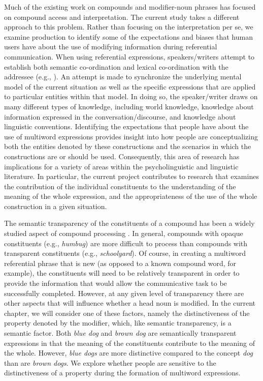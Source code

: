\documentclass[output=paper]{langsci/langscibook}
\begin{document}
Much of the existing work on compounds and modifier-noun phrases has
focused on compound access and interpretation. The current study takes
a different approach to this problem. Rather than focusing on the
interpretation per se, we examine production to identify some of the
expectations and biases that human users have about the use of
modifying information during referential communication. When using
referential expressions, speakers/writers attempt to establish both
semantic co-ordination and lexical co-ordination with the addressee
(e.g.,
\citealt{clark1986referring,garrod1987saying,clark1989contributing}). An
attempt is made to synchronize the underlying mental model of the
current situation as well as the specific expressions that are applied
to particular entities within that model. In doing so, the
speaker/writer draws on many different types of knowledge, including
world knowledge, knowledge about information expressed in the
conversation/discourse, and knowledge about linguistic
conventions. Identifying the expectations that people have about the
use of multiword expressions provides insight into how people are
conceptualizing both the entities denoted by these constructions and
the scenarios in which the constructions are or should be used.
Consequently, this area of research has implications for a variety of
areas within the psycholinguistic and linguistic literature. In
particular, the current project contributes to research that examines
the contribution of the individual constituents to the understanding
of the meaning of the whole expression, and the appropriateness of the
use of the whole construction in a given situation.

The semantic transparency of the constituents of a compound has been a
widely studied aspect of compound processing \citep{libben1998semantic,jarema1999processing,gagne2016effects,smolka2017can}. In general,
compounds with opaque constituents (e.g., \textit{humbug}) are more
difficult to process than compounds with transparent constituents
(e.g., \textit{schoolyard}). Of course, in creating a multiword
referential phrase that is new (as opposed to a known compound word,
for example), the constituents will need to be relatively transparent
in order to provide the information that would allow the communicative
task to be successfully completed. However, at any given level of
transparency there are other aspects that will influence whether a
head noun is modified. In the current chapter, we will consider one of
these factors, namely the distinctiveness of the property denoted by
the modifier, which, like semantic transparency, is a semantic factor.
Both \textit{blue dog} and \textit{brown dog} are semantically
transparent expressions in that the meaning of the constituents
contribute to the meaning of the whole. However, \textit{blue dogs}
are more distinctive compared to the concept \textit{dog} than are
\textit{brown dogs}. We explore whether people are sensitive to the
distinctiveness of a property during the formation of multiword
expressions.
\end{document}
